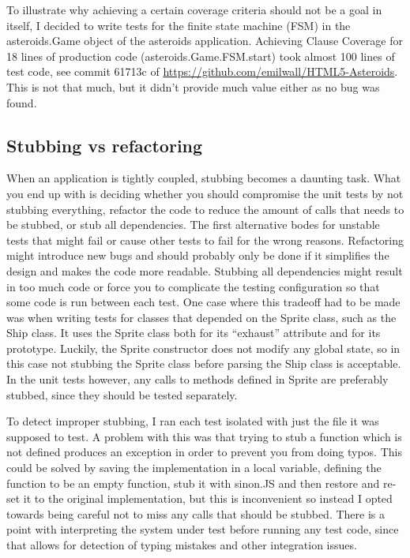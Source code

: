 \documentclass[11pt]{article}
\begin{document}
To illustrate why achieving a certain coverage criteria should not be a goal in itself, I decided to write tests for the finite state machine (FSM) in the asteroids.Game object of the asteroids application. Achieving Clause Coverage\cite[p.~106]{AmmannOffutt} for 18 lines of production code (asteroids.Game.FSM.start) took almost 100 lines of test code, see commit 61713c of \url{https://github.com/emilwall/HTML5-Asteroids}. This is not that much, but it didn't provide much value either as no bug was found.

\subsection{Stubbing vs refactoring}

When an application is tightly coupled, stubbing becomes a daunting task. What you end up with is deciding whether you should compromise the unit tests by not stubbing everything, refactor the code to reduce the amount of calls that needs to be stubbed, or stub all dependencies. The first alternative bodes for unstable tests that might fail or cause other tests to fail for the wrong reasons. Refactoring might introduce new bugs and should probably only be done if it simplifies the design and makes the code more readable. Stubbing all dependencies might result in too much code or force you to complicate the testing configuration so that some code is run between each test. One case where this tradeoff had to be made was when writing tests for classes that depended on the Sprite class, such as the Ship class. It uses the Sprite class both for its ``exhaust'' attribute and for its prototype. Luckily, the Sprite constructor does not modify any global state, so in this case not stubbing the Sprite class before parsing the Ship class is acceptable. In the unit tests however, any calls to methods defined in Sprite are preferably stubbed, since they should be tested separately.

To detect improper stubbing, I ran each test isolated with just the file it was supposed to test. A problem with this was that trying to stub a function which is not defined produces an exception in order to prevent you from doing typos. This could be solved by saving the implementation in a local variable, defining the function to be an empty function, stub it with sinon.JS and then restore and re-set it to the original implementation, but this is inconvenient so instead I opted towards being careful not to miss any calls that should be stubbed. There is a point with interpreting the system under test before running any test code, since that allows for detection of typing mistakes and other integration issues.
\end{document}
